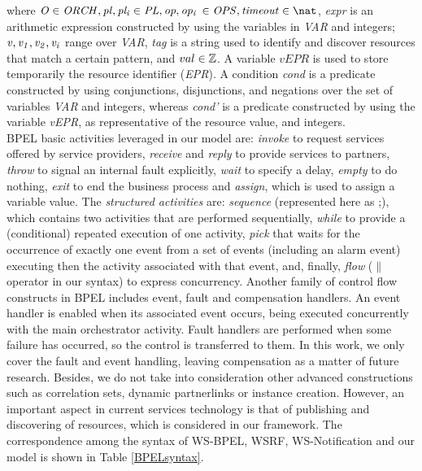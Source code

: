  \hspace{0.4cm}where ${\it O \in ORCH, pl,pl_{i} \in PL, op,op_{i}}$ ${\it \in OPS, timeout \in \nat}$, {\it  expr} is an arithmetic expression constructed by using the variables in {\it VAR} and integers; ${\it v,v_1,v_2,v_i}$ range over {\it VAR}, {\it tag} is a string used to identify and discover resources that match a certain pattern, and $val \in \mathbb{Z}$. A variable $vEPR$ is used to store temporarily the resource identifier ({\it EPR}). A condition {\it cond} is a predicate constructed by using conjunctions, disjunctions, and negations over the set of variables {\it VAR} and integers, whereas {\it cond'} is a predicate constructed by using the variable {\it vEPR}, as representative of the resource value, and integers. \\%
BPEL basic activities leveraged in our model are: \emph{invoke} to request services offered by service providers, \emph{receive} and \emph{reply} to provide services to partners, \emph{throw} to signal an internal fault explicitly, \emph{wait} to specify a delay, \emph{empty} to do nothing, \emph{exit} to end the business process and \emph{assign}, which is used to assign a variable value. The \emph{structured activities} are: \emph{sequence} (represented here as ;), which contains two activities that are performed sequentially, \emph{while} to provide a (conditional) repeated execution of one activity, \emph{pick} that waits for the occurrence of exactly one event from a set of events (including an alarm event) executing then the activity associated with that event, and, finally, \emph{flow} ($\|$ operator in our syntax) to express concurrency. Another family of control flow constructs in BPEL includes event, fault and compensation handlers. An event handler is enabled when
its associated event occurs, being executed concurrently with the main orchestrator activity. Fault handlers are performed when some failure has occurred, so the control is transferred to them. In this work, we only cover the fault and event handling, leaving compensation as a matter of future research. Besides, we do not take into consideration other advanced constructions such as correlation sets, dynamic partnerlinks or instance creation. However, an important aspect in current services technology is that of publishing and discovering of resources, which is considered in our framework. The correspondence among the syntax of WS-BPEL, WSRF, WS-Notification and our model is shown in Table \ref{BPELsyntax}.
